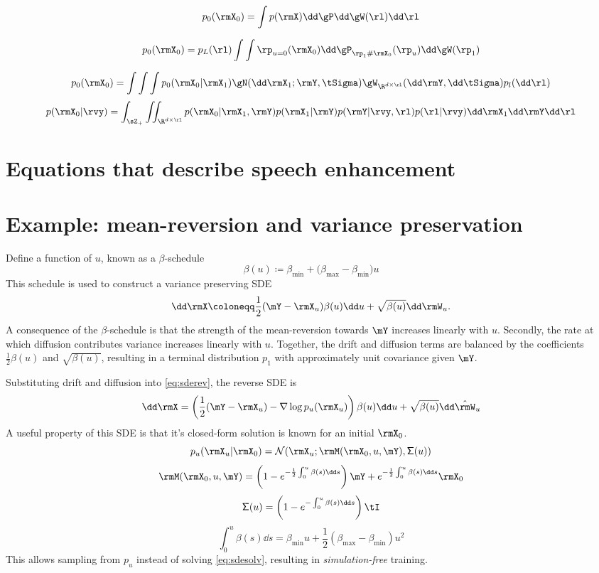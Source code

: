 \[
p_0(\rmX_0) = \int p(\rmX)\dd \gP \dd\gW(\rl) \dd \rl
\]

\[
p_0(\rmX_0)=p_L(\rl)\int\int \rp_{u=0}(\rmX_0)\dd\gP_{\rp_1\#\rmX_0}(\rp_u)\dd\gW( \rp_1)
\]

\[
p_0(\rmX_0)= \int\int\int p_0(\rmX_0|\rmX_1)\gN(\dd \rmX_1;\rmY,\tSigma)\gW_{\R^{d\times\rl}}(\dd\rmY,\dd\tSigma)p_l(\dd\rl)
\]
\[
p(\rmX_0|\rvy)=\int_{\sZ_+}\iint_{\R^{d\times\rl}} p(\rmX_0|\rmX_1,\rmY)p(\rmX_1|\rmY)p(\rmY|\rvy,\rl)p(\rl|\rvy)\dd\rmX_1\dd\rmY\dd\rl
\]

\section{Equations that describe speech enhancement}

\section{Example: mean-reversion and variance preservation}
Define a function of $u$, known as a  $\beta$-schedule
\[
\beta(u)\coloneqq\beta_{\min}+\bigl(\beta_{\max}-\beta_{\min}\bigr)u
\]
This schedule is used to construct a variance preserving SDE
\[
\dd \rmX \coloneqq \frac{1}{2}(\mY - \rmX_u)\beta(u) \dd u + \sqrt{\beta(u)} \dd\rmW_u.
\]
A consequence of the $\beta$-schedule is that the strength of the mean-reversion towards $\mY$ increases linearly with $u$. Secondly, the rate at which diffusion contributes variance increases linearly with $u$. Together, the drift and diffusion terms are balanced by the coefficients $\frac{1}{2}\beta(u)$ and $\sqrt{\beta(u)}$, resulting in a terminal distribution $p_1$ with approximately unit covariance given $\mY$.


Substituting drift and diffusion into \eqref{eq:sderev}, the reverse SDE is
\[
\dd \rmX = \left(\frac{1}{2}(\mY - \rmX_u) - \nabla\log p_u(\rmX_u)\right)\beta(u) \dd u + \sqrt{\beta(u)} \dd\hat\rmW_u
\]
A useful property of this SDE is that it's closed-form solution is known for an initial $\rmX_0$.
\[
p_u(\rmX_u|\rmX_0) = \mathcal N(\rmX_u;\rmM(\rmX_0,u,\mY),\mathsf\Sigma(u))
\]
\[
\rmM(\rmX_0,u,\mY) = \left(1-e^{-\frac{1}{2}\int_0^u\beta(s)\dd s}\right)\mY +e^{-\frac{1}{2}\int_0^u\beta(s)\dd s}\rmX_0
\]
\[
\mathsf\Sigma(u) = \left(1-e^{-\int_0^u\beta(s)\dd s}\right)\tI
\]
\[
\int_0^u\beta(s)\dd s = \beta_{\min}u + \frac{1}{2}(\beta_{\max}-\beta_{\min})u^2
\]
This allows sampling from $p_u$ instead of solving \eqref{eq:sdesolv}, resulting in \textit{simulation-free} training.

